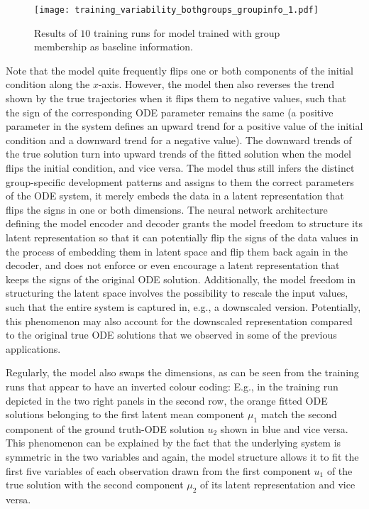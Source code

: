 \begin{figure}
	\centering
	\texttt{[image: training\_variability\_bothgroups\_groupinfo\_1.pdf]}
	\caption{Results of $10$ training runs for model trained with group membership as baseline information.}
	\label{fig:apps_training_variability_gi_1}
\end{figure}

Note that the model quite frequently flips one or both components of the initial condition along the $x$-axis. However, the model then also reverses the trend shown by the true trajectories when it flips them to negative values, such that the sign of the corresponding ODE parameter remains the same (a positive parameter in the system defines an upward trend for a positive value of the initial condition and a downward trend for a negative value). The downward trends of the true solution turn into upward trends of the fitted solution when the model flips the initial condition, and vice versa. 
The model thus still infers the distinct group-specific development patterns and assigns to them the correct parameters of the ODE system, it merely embeds the data in a latent representation that flips the signs in one or both dimensions. The neural network architecture defining the model encoder and decoder grants the model freedom to structure its latent representation so that it can potentially flip the signs of the data values in the process of embedding them in latent space and flip them back again in the decoder, and does not enforce or even encourage a latent representation that keeps the signs of the original ODE solution. 
Additionally, the model freedom in structuring the latent space involves the possibility to rescale the input values, such that the entire system is captured in, e.g., a downscaled version. Potentially, this phenomenon may also account for the downscaled representation compared to the original true ODE solutions that we observed in some of the previous applications. 

Regularly, the model also swaps the dimensions, as can be seen from the training runs that appear to have an inverted colour coding: E.g., in the training run depicted in the two right panels in the second row, the orange fitted ODE solutions belonging to the first latent mean component $\mu_1$ match the second component of the ground truth-ODE solution $u_2$ shown in blue and vice versa. This phenomenon can be explained by the fact that the underlying system is symmetric in the two variables and again, the model structure allows it to fit the first five variables of each observation drawn from the first component $u_1$ of the true solution with the second component $\mu_2$ of its latent representation and vice versa. 

